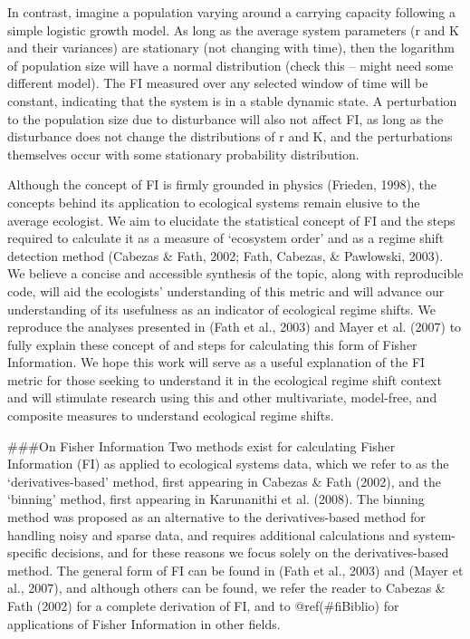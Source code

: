\documentclass[12pt,twoside]{reedthesis}
\begin{document}
In contrast, imagine a population varying around a carrying capacity following a simple logistic growth model. As long as the average system parameters (r and K and their variances) are stationary (not changing with time), then the logarithm of population size will have a normal distribution (check this -- might need some different model). The FI measured over any selected window of time will be constant, indicating that the system is in a stable dynamic state. A perturbation to the population size due to disturbance will also not affect FI, as long as the disturbance does not change the distributions of r and K, and the perturbations themselves occur with some stationary probability distribution.

Although the concept of FI is firmly grounded in physics (Frieden, 1998), the concepts behind its application to ecological systems remain elusive to the average ecologist. We aim to elucidate the statistical concept of FI and the steps required to calculate it as a measure of `ecosystem order' and as a regime shift detection method (Cabezas \& Fath, 2002; Fath, Cabezas, \& Pawlowski, 2003). We believe a concise and accessible synthesis of the topic, along with reproducible code, will aid the ecologists' understanding of this metric and will advance our understanding of its usefulness as an indicator of ecological regime shifts. We reproduce the analyses presented in (Fath et al., 2003) and Mayer et al. (2007) to fully explain these concept of and steps for calculating this form of Fisher Information. We hope this work will serve as a useful explanation of the FI metric for those seeking to understand it in the ecological regime shift context and will stimulate research using this and other multivariate, model-free, and composite measures to understand ecological regime shifts.

\#\#\#On Fisher Information
Two methods exist for calculating Fisher Information (FI) as applied to ecological systems data, which we refer to as the `derivatives-based' method, first appearing in Cabezas \& Fath (2002), and the `binning' method, first appearing in Karunanithi et al. (2008). The binning method was proposed as an alternative to the derivatives-based method for handling noisy and sparse data, and requires additional calculations and system-specific decisions, and for these reasons we focus solely on the derivatives-based method. The general form of FI can be found in (Fath et al., 2003) and (Mayer et al., 2007), and although others can be found, we refer the reader to Cabezas \& Fath (2002) for a complete derivation of FI, and to @ref(\#fiBiblio) for applications of Fisher Information in other fields.
\end{document}
